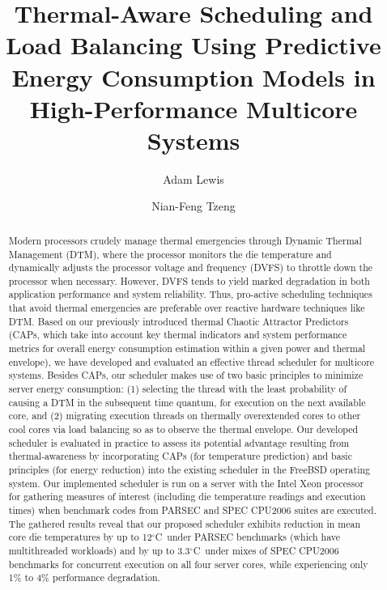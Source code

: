 \documentclass[times, 10pt,twocolumn]{IEEEtran}
\begin{document}
\title{Thermal-Aware Scheduling and Load Balancing Using Predictive
  Energy Consumption Models in High-Performance Multicore Systems} 
\author[]{Adam  Lewis} 
\author[]{Nian-Feng Tzeng} 
\maketitle
\newtheorem{defn}{Definition}
\newtheorem{thm}{Theorem}
\thispagestyle{empty}
\begin{abstract}
  Modern processors crudely manage thermal emergencies through Dynamic
  Thermal Management (DTM), where the processor monitors the die
  temperature and dynamically adjusts the processor voltage and
  frequency (DVFS) to throttle down the processor when
  necessary. However, DVFS tends to yield marked degradation in both
  application performance and system reliability. Thus, pro-active
  scheduling techniques that avoid thermal emergencies are preferable
  over reactive hardware techniques like DTM.  Based on our previously
  introduced thermal Chaotic Attractor Predictors (CAPs, which take into
  account key thermal indicators and system performance metrics for
  overall energy consumption estimation within a given power and thermal
  envelope), we have developed and evaluated an effective thread
  scheduler for multicore systems.  Besides CAPs, our scheduler makes
  use of two basic principles to minimize server energy consumption: (1)
  selecting the thread with the least probability of causing a DTM in
  the subsequent time quantum, for execution on the next available core,
  and (2) migrating execution threads on thermally overextended cores to
  other cool cores via load balancing so as to observe the thermal
  envelope.  Our developed scheduler is evaluated in practice to assess
  its potential advantage resulting from thermal-awareness by
  incorporating CAPs (for temperature prediction) and basic principles
  (for energy reduction) into the existing scheduler in the FreeBSD
  operating system.  Our implemented scheduler is run on a server with
  the Intel Xeon processor for gathering measures of interest (including
  die temperature readings and execution times) when benchmark codes
  from PARSEC and SPEC CPU2006 suites are executed.  The gathered
  results reveal that our proposed scheduler exhibits reduction in mean
  core die temperatures by up to 12$^{\circ}$C\ under PARSEC
  benchmarks (which have multithreaded workloads) and by up to 3.3$^{\circ}$C\
  under mixes of SPEC CPU2006 benchmarks for concurrent  
  execution on all four server cores, while experiencing
  only 1\% to 4\% performance degradation.
\end{abstract}
\end{document}
